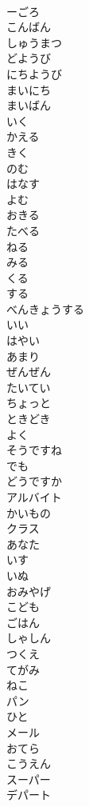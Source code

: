 \documentclass[8pt]{extreport}
\begin{document}
\begin{CJK}{UTF8}{min}
\\	ーごろ	
\\	こんばん	
\\	しゅうまつ	
\\	どようび	
\\	にちようび	
\\	まいにち	
\\	まいばん	
\\	いく	
\\	かえる	
\\	きく	
\\	のむ	
\\	はなす	
\\	よむ	
\\	おきる	
\\	たべる	
\\	ねる	
\\	みる	
\\	くる	
\\	する	
\\	べんきょうする	
\\	いい	
\\	はやい	
\\	あまり 
\\	ぜんぜん 
\\	たいてい	
\\	ちょっと	
\\	ときどき	
\\	よく	
\\	そうですね	
\\	でも	
\\	どうですか	
\\	アルバイト	
\\	かいもの	
\\	クラス	
\\	あなた	
\\	いす	
\\	いぬ	
\\	おみやげ	
\\	こども	
\\	ごはん	
\\	しゃしん	
\\	つくえ	
\\	てがみ	
\\	ねこ	
\\	パン	
\\	ひと	
\\	メール	
\\	おてら	
\\	こうえん	
\\	スーパー	
\\	デパート	

\end{CJK}
\end{document}
